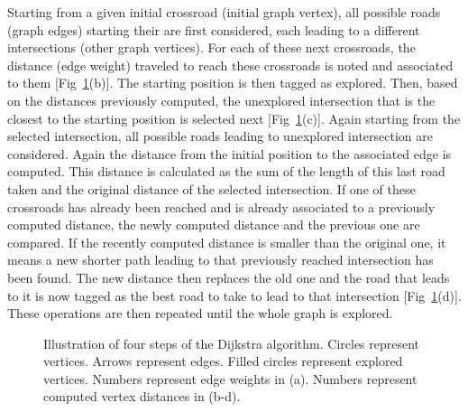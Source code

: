 Starting from a given initial crossroad (initial graph vertex), all possible roads (graph edges) starting their are first considered, each leading to a different intersections (other graph vertices).
For each of these next crossroads, the distance (edge weight) traveled to reach these crossroads is noted and associated to them [Fig~\ref{fig:dijkstra_principle}(b)].
The starting position is then tagged as explored.
Then, based on the distances previously computed, the unexplored intersection that is the closest to the starting position is selected next [Fig~\ref{fig:dijkstra_principle}(c)].
Again starting from the selected intersection, all possible roads leading to unexplored intersection are considered.
Again the distance from the initial position to the associated edge is computed.
This distance is calculated as the sum of the length of this last road taken and the original distance of the selected intersection.
If one of these crossroads has already been reached and is already associated to a previously computed distance, the newly computed distance and the previous one are compared.
If the recently computed distance is smaller than the original one, it means a new shorter path leading to that previously reached intersection has been found.
The new distance then replaces the old one and the road that leads to it is now tagged as the best road to take to lead to that intersection [Fig~\ref{fig:dijkstra_principle}(d)].
These operations are then repeated until the whole graph is explored.
\begin{figure}
	\centering
	\def\svgwidth{\textwidth}
	
  	\caption[Illustration of four steps of the Dijkstra algorithm.]{
  		Illustration of four steps of the Dijkstra algorithm.
  		Circles represent vertices.
  		Arrows represent edges.
  		Filled circles represent explored vertices.
  		Numbers represent edge weights in (a).
  		Numbers represent computed vertex distances in (b-d).
  	}
  	\label{fig:dijkstra_principle}
\end{figure}

